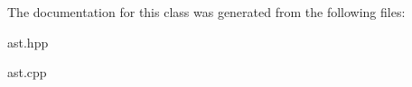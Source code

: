 The documentation for this class was generated from the following files\+:\begin{DoxyCompactItemize}
\item 
ast.\+hpp\item 
ast.\+cpp\end{DoxyCompactItemize}
